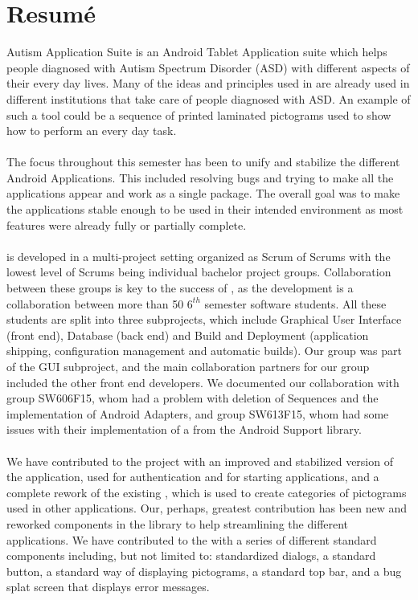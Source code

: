 \chapter{Resumé}
\giraf Autism Application Suite is an Android Tablet Application suite which helps people diagnosed with Autism Spectrum Disorder (ASD) with different aspects of their every day lives. Many of the ideas and principles used in \giraf are already used in different institutions that take care of people diagnosed with ASD. An example of such a tool could be a sequence of printed laminated pictograms used to show how to perform an every day task.
\\\\
The focus throughout this semester has been to unify and stabilize the different \giraf Android Applications. This included resolving bugs and trying to make all the applications appear and work as a single package. The overall goal was to make the applications stable enough to be used in their intended environment as most features were already fully or partially complete.  
\\\\
\giraf is developed in a multi-project setting organized as Scrum of Scrums with the lowest level of Scrums being individual bachelor project groups. Collaboration between these groups is key to the success of \giraf, as the development is a collaboration between more than 50 $6^{th}$ semester software students. All these students are split into three subprojects, which include Graphical User Interface (front end), Database (back end) and Build and Deployment (application shipping, configuration management and automatic builds). Our group was part of the GUI subproject, and the main collaboration partners for our group included the other front end developers. We documented our collaboration with group SW606F15, whom had a problem with deletion of \giraf Sequences and the implementation of Android Adapters, and group SW613F15, whom had some issues with their implementation of a  from the Android Support library. 
\\\\
We have contributed to the project with an improved and stabilized version of the \giraf \launcher application, used for authentication and for starting \giraf applications, and a complete rework of the existing \giraf \ct, which is used to create categories of pictograms used in other applications. Our, perhaps, greatest contribution has been new and reworked components in the \gc library to help streamlining the different applications. We have contributed to the \gc with a series of different standard components including, but not limited to: standardized dialogs, a standard button, a standard way of displaying pictograms, a standard top bar, and a bug splat screen that displays error messages.
